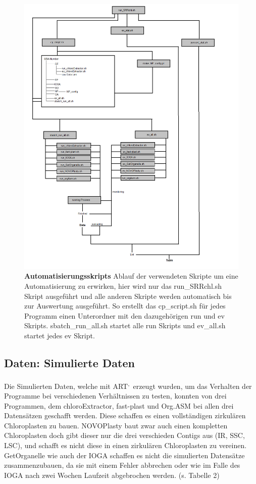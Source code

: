 \documentclass{scrartcl}
\begin{document}
\begin{figure}
\includegraphics[width=.9\linewidth]{./Diagram_Master.png}
\caption[Automatisierungsskripts]{\textbf{Automatisierungsskripts} Ablauf der verwendeten Skripte um eine Automatisierung zu erwirken, hier wird nur das run\_SRRchl.sh Skript ausgeführt und alle anderen Skripte werden automatisch bis zur Auswertung ausgeführt. So erstellt das cp\_script.sh für jedes Programm einen Unterordner mit den dazugehörigen run und ev Skripts. sbatch\_run\_all.sh startet alle run Skripts und ev\_all.sh startet jedes ev Skript.}
\end{figure}


\subsection{Daten: Simulierte Daten}
\label{sec-4-2}
Die Simulierten Daten, welche mit ART\footnotemark[53]{}\textsuperscript{,}\,\footnotemark[54]{} erzeugt wurden, um das Verhalten der Programme bei verschiedenen Verhältnissen zu testen, konnten von drei Programmen, dem chloroExtractor, fast-plast und Org.ASM 
bei allen drei Datensätzen geschafft werden. Diese schaffen es einen vollständigen zirkulären Chloroplasten zu bauen. NOVOPlasty baut zwar auch einen kompletten Chloroplasten doch gibt dieser 
nur die drei verschieden Contigs aus (IR, SSC, LSC), und schafft es nicht diese in einen zirkulären Chloroplasten zu vereinen. GetOrganelle wie auch der IOGA schaffen es nicht die
simulierten Datensätze zusammenzubauen, da sie mit einem Fehler abbrechen oder wie im Falle des IOGA nach zwei Wochen Laufzeit abgebrochen werden. (s. Tabelle 2) 
\end{document}
